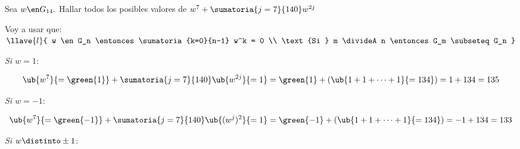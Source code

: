 \begin{enunciado}{\ejExtra}
  Sea $w \en G_{14}.$
  Hallar todos los posibles valores de
  $w^7 + \sumatoria{j=7}{140}w^{2j}$
\end{enunciado}

Voy a usar que:
$
  \llave{l}{
    w \en G_n \entonces \sumatoria{k=0}{n-1} w^k = 0 \\
    \text{Si } m \divideA n \entonces G_m \subseteq G_n
  }
$

\textit{Si $w = 1$}:

$$
  \ub{w^7}{= \green{1}} + \sumatoria{j=7}{140} \ub{w^{2j}}{=1} =
  \green{1} + (\ub{1+1+\dots+1}{ = 134}) =
  1 + 134 =
  135
$$

\textit{Si $w = -1$}:

$$
  \ub{w^7}{= \green{-1}} + \sumatoria{j=7}{140} \ub{(w^j)^2}{= 1} =
  \green{-1} + (\ub{1+1+\dots+1}{ = 134}) =
  -1 + 134 =
  133
$$

\textit{Si $w \distinto \pm 1$}:

